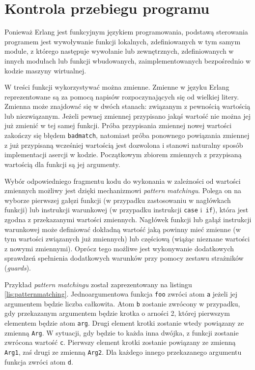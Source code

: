 \section{Kontrola przebiegu programu}
\label{sec:erlangFlow}

Ponieważ Erlang jest funkcyjnym językiem programowania, podstawą sterowania programem jest wywoływanie funkcji lokalnych, zdefiniowanych w tym samym module, z którego następuje wywołanie lub zewnętrznych, zdefiniowanych w innych modułach lub funkcji wbudowanych, zaimplementowanych bezpośrednio w kodzie maszyny wirtualnej.

W treści funkcji wykorzystywać można zmienne.
Zmienne w języku Erlang reprezentowane są za pomocą napisów rozpoczynających się od wielkiej litery.
Zmienna może znajdować się w dwóch stanach: związanym z pewnością wartością lub niezwiązanym.
Jeżeli pewnej zmiennej przypisano jakąś wartość nie można jej już zmienić w tej samej funkcji.
Próba przypisania zmiennej nowej wartości zakończy się błędem \texttt{badmatch}, natomiast próba ponownego powiązania zmiennej z już przypisaną wcześniej wartością jest dozwolona i stanowi naturalny sposób implementacji asercji w kodzie.
Początkowym zbiorem zmiennych z przypisaną wartością dla funkcji są jej argumenty.

Wybór odpowiedniego fragmentu kodu do wykonania w zależności od wartości zmiennych możliwy jest dzięki mechanizmowi \emph{pattern matchingu}.
Polega on na wyborze pierwszej gałęzi funkcji (w przypadku zastosowaniu w nagłówkach funkcji) lub instrukcji warunkowej (w przypadku instrukcji \texttt{case} i~\texttt{if}), która jest zgodna z przekazanymi wartości zmiennych.
Nagłówek funkcji lub gałąź instrukcji warunkowej może definiować dokładną wartość jaką powinny mieć zmienne (w tym wartości związanych już zmiennych) lub częściową (wiążąc nieznane wartości z nowymi zmiennymi).
Oprócz tego możliwe jest wykonywanie dodatkowych sprawdzeń spełnienia dodatkowych warunków przy pomocy zestawu strażników (\emph{guards}).

Przykład \emph{pattern matchingu} został zaprezentowany na listingu \ref{lis:patternmatching}.
Jednoargumentowa funkcja \texttt{foo} zwróci atom \texttt{a} jeżeli jej argumentem będzie liczba całkowita.
Atom \texttt{b} zostanie zwrócony w przypadku, gdy przekazanym argumentem będzie krotka o arności 2, której pierwszym elementem będzie atom \texttt{arg}. Drugi element krotki zostanie wtedy powiązany ze zmienną \texttt{Arg}. W sytuacji, gdy będzie to każda inna dwójka, z funkcji zostanie zwrócona wartość \texttt{c}. Pierwszy element krotki zostanie powiązany ze zmienną \texttt{Arg1}, zaś drugi ze zmienną \texttt{Arg2}.
Dla każdego innego przekazanego argumentu funkcja zwróci atom \texttt{d}.

